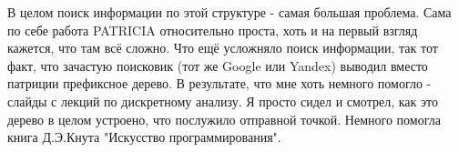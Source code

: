 \documentclass[12pt]{article}
\begin{document}
В целом поиск информации по этой структуре - самая большая проблема. Сама по себе работа PATRICIA относительно проста, хоть и на первый взгляд кажется, что там всё сложно. Что ещё усложняло поиск информации, так тот факт, что зачастую поисковик (тот же Google или Yandex) выводил вместо патриции префиксное дерево. В результате, что мне хоть немного помогло - слайды с лекций по дискретному анализу. Я просто сидел и смотрел, как это дерево в целом устроено, что послужило отправной точкой. Немного помогла книга Д.Э.Кнута "Искусство программирования".
\end{document}
